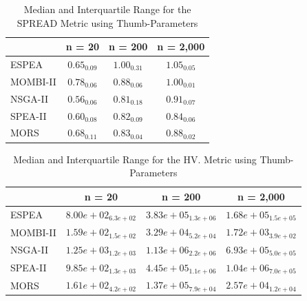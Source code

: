 \par
\begin{table}[!htp]
\centering
\begin{tabular}{@{}lccc@{}}
\toprule
         & n = 20                          & n = 200                         & n = 2,000         \\ \midrule
ESPEA    & $0.65_{0.09}$                   & $1.00_{0.31}$                   & $1.05_{0.05}$                   \\
MOMBI-II & $0.78_{0.06}$                   & $0.88_{0.06}$                   & $1.00_{0.01}$                   \\
NSGA-II  & \cellcolor{gray95}$0.56_{0.06}$ & \cellcolor{gray95}$0.81_{0.18}$ & $0.91_{0.07}$                   \\
SPEA-II  & \cellcolor{gray25}$0.60_{0.08}$ & \cellcolor{gray25}$0.82_{0.09}$ & \cellcolor{gray95}$0.84_{0.06}$ \\
MORS     & $0.68_{0.11}$                   & $0.83_{0.04}$                   & \cellcolor{gray25}$0.88_{0.02}$ \\ \bottomrule
\end{tabular}%
\caption{Median and Interquartile Range for the SPREAD Metric using Thumb-Parameters}
\label{tab:spread_thumb}
\end{table}

\par
\begin{table}[!htp]
\centering
\begin{tabular}{@{}lccc@{}}
\toprule
         & n = 20                                    & n = 200                                   & n = 2,000                                 \\ \midrule
ESPEA    & $  8.00e+02_{ 6.3e+02}$                   & $  3.83e+05_{ 1.3e+06}$                   & $  1.68e+05_{ 1.5e+05}$                   \\
MOMBI-II & $  1.59e+02_{ 1.5e+02}$                   & $  3.29e+04_{ 5.2e+04}$                   & $  1.72e+03_{ 3.9e+02}$                   \\
NSGA-II  & \cellcolor{gray95}$  1.25e+03_{ 1.2e+03}$ & \cellcolor{gray95}$  1.13e+06_{ 2.2e+06}$ & \cellcolor{gray25}$  6.93e+05_{ 5.0e+05}$ \\
SPEA-II  & \cellcolor{gray25}$  9.85e+02_{ 1.3e+03}$ & \cellcolor{gray25}$  4.45e+05_{ 1.1e+06}$ & \cellcolor{gray95}$  1.04e+06_{ 7.0e+05}$ \\
MORS     & $  1.61e+02_{ 4.2e+02}$                   & $  1.37e+05_{ 7.9e+04}$                   & $  2.57e+04_{ 1.2e+04}$                   \\ \bottomrule
\end{tabular}%
\caption{Median and Interquartile Range for the HV. Metric using Thumb-Parameters}
\label{tab:hv_thumb}
\end{table}

